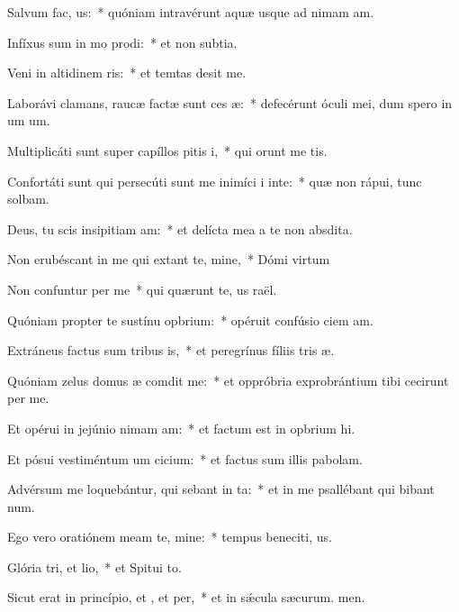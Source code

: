 \item Salvum  fac, us:~* quóniam intravérunt aquæ usque ad nimam am.
\item Infíxus sum in mo prodi:~* et non  subtia.
\item Veni in altidinem ris:~* et temtas desit me.
\item Laborávi clamans, raucæ factæ sunt ces æ:~* defecérunt óculi mei, dum spero in um um.
\item Multiplicáti sunt super capíllos pitis i,~* qui orunt me tis.
\item Confortáti sunt qui persecúti sunt me inimíci i inte:~* quæ non rápui, tunc solbam.
\item Deus, tu scis insipitiam am:~* et delícta mea a te non  absdita.
\item Non erubéscant in me qui extant te, mine,~* Dómi virtum
\item Non confuntur per me~* qui quærunt te, us raël.
\item Quóniam propter te sustínu opbrium:~* opéruit confúsio ciem am.
\item Extráneus factus sum tribus is,~* et peregrínus fíliis tris æ.
\item Quóniam zelus domus æ comdit me:~* et oppróbria exprobrántium tibi cecirunt per me.
\item Et opérui in jejúnio nimam am:~* et factum est in opbrium hi.
\item Et pósui vestiméntum um cicium:~* et factus sum illis  pabolam.
\item Advérsum me loquebántur, qui sebant in ta:~* et in me psallébant qui bibant num.
\item Ego vero oratiónem meam  te, mine:~* tempus beneciti, us.
\item Glória tri, et lio,~* et Spitui to.
\item Sicut erat in princípio, et , et per,~* et in sǽcula sæcurum. men.
